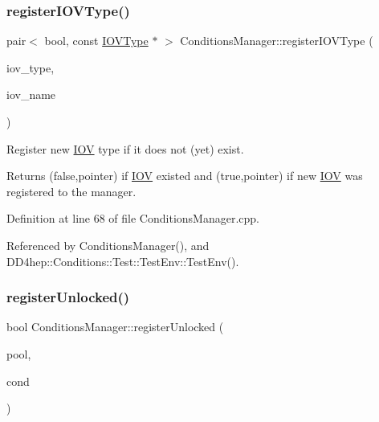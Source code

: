 \hypertarget{class_d_d4hep_1_1_conditions_1_1_conditions_manager_ad4a0de1bf5d55f2b110e50b06bf6d6c7}{}\label{class_d_d4hep_1_1_conditions_1_1_conditions_manager_ad4a0de1bf5d55f2b110e50b06bf6d6c7} 
\subsubsection{\texorpdfstring{register\+I\+O\+V\+Type()}{registerIOVType()}}
{\footnotesize\ttfamily pair$<$ bool, const \hyperlink{class_d_d4hep_1_1_i_o_v_type}{I\+O\+V\+Type} $\ast$ $>$ Conditions\+Manager\+::register\+I\+O\+V\+Type (\begin{DoxyParamCaption}\item[{size\+\_\+t}]{iov\+\_\+type,  }\item[{const std\+::string \&}]{iov\+\_\+name }\end{DoxyParamCaption})}



Register new \hyperlink{class_d_d4hep_1_1_i_o_v}{I\+OV} type if it does not (yet) exist. 

Returns (false,pointer) if \hyperlink{class_d_d4hep_1_1_i_o_v}{I\+OV} existed and (true,pointer) if new \hyperlink{class_d_d4hep_1_1_i_o_v}{I\+OV} was registered to the manager. 

Definition at line 68 of file Conditions\+Manager.\+cpp.



Referenced by Conditions\+Manager(), and D\+D4hep\+::\+Conditions\+::\+Test\+::\+Test\+Env\+::\+Test\+Env().

\hypertarget{class_d_d4hep_1_1_conditions_1_1_conditions_manager_abd5482f92d8b86346c6fbd5865486075}{}\label{class_d_d4hep_1_1_conditions_1_1_conditions_manager_abd5482f92d8b86346c6fbd5865486075} 
\subsubsection{\texorpdfstring{register\+Unlocked()}{registerUnlocked()}}
{\footnotesize\ttfamily bool Conditions\+Manager\+::register\+Unlocked (\begin{DoxyParamCaption}\item[{\hyperlink{class_d_d4hep_1_1_conditions_1_1_conditions_pool}{Conditions\+Pool} $\ast$}]{pool,  }\item[{\hyperlink{class_d_d4hep_1_1_conditions_1_1_condition}{Condition}}]{cond }\end{DoxyParamCaption})}



